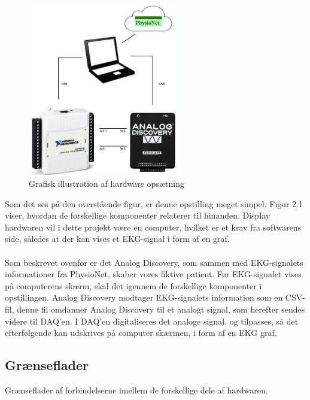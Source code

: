 \begin{figure}[H]
	\centering
	\includegraphics[width=0.6\textwidth]{Figurer/Snip20150427_1}
	\caption{Grafisk illustration af hardware opsætning}
\end{figure}

Som det ses på den overstående figur, er denne opstilling meget simpel. Figur 2.1 viser, hvordan de forskellige komponenter relaterer til hinanden. Display hardwaren vil i dette projekt være en computer, hvilket er et krav fra softwarens side, således at der kan vises et EKG-signal i form af en graf.
\\
\\  
Som beskrevet ovenfor er det Analog Discovery, som sammen med EKG-signalets informationer fra PhysioNet, skaber vores fiktive patient. Før EKG-signalet vises på computerens skærm, skal det igennem de forskellige komponenter i opstillingen. Analog Discovery modtager EKG-signalets  information som en CSV-fil, denne fil omdanner Analog Discovery til et analogt signal, som herefter sendes videre til DAQ’en. I DAQ’en digitaliseres det analoge signal, og tilpasses, så det efterfølgende kan udskrives på computer skærmen, i form af en EKG graf. 

\subsection{Grænseflader}
Grænseflader af forbindelserne imellem de forskellige dele af hardwaren. 

